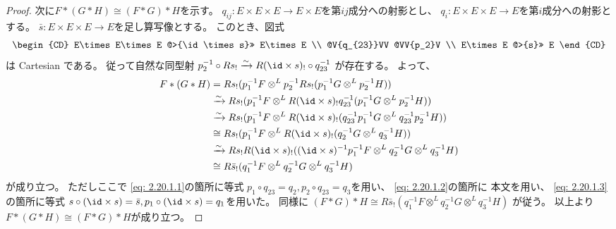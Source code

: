 \documentclass[uplatex,dvipdfmx]{jsarticle}
\begin{document}
\begin{proof}
  次に\(F*(G*H)\cong (F*G)*H\)を示す。
  \(q_{ij}:E\times E\times E \to E\times E\)を第\(ij\)成分への射影とし、
  \(q_i:E\times E\times E \to E\)を第\(i\)成分への射影とする。
  \(\bar{s}:E\times E\times E \to E\)を足し算写像とする。
  このとき、図式
  \[
  \begin{CD}
    E\times E\times E @>{\id\times s}>> E\times E \\
    @V{q_{23}}VV @VV{p_2}V \\
    E\times E @>{s}>> E
  \end{CD}
  \]
  は Cartesian である。
  従って自然な同型射
  \(p_2^{-1}\circ Rs_!\xrightarrow{\sim} R(\id\times s)_!\circ q_{23}^{-1}\)
  が存在する。
  よって、
  \begin{align}
    F*(G*H)
    &= Rs_!(p_1^{-1}F\otimes^L p_2^{-1}Rs_!(p_1^{-1}G\otimes^L p_2^{-1}H)) \notag \\
    &\xrightarrow{\sim}
    Rs_!(p_1^{-1}F\otimes^L R(\id\times s)_!q_{23}^{-1}(p_1^{-1}G\otimes^L p_2^{-1}H))
    \notag \\
    &\xrightarrow{\sim}
    Rs_!(p_1^{-1}F\otimes^L R(\id\times s)_!
    (q_{23}^{-1}p_1^{-1}G\otimes^L q_{23}^{-1}p_2^{-1}H)) \notag \\
    &\cong Rs_!(p_1^{-1}F\otimes^L R(\id\times s)_!(q_2^{-1}G\otimes^L q_3^{-1}H))
    \label{eq: 2.20.1.1} \\
    &\xrightarrow{\sim}
    Rs_!R(\id\times s)_!((\id\times s)^{-1} p_1^{-1}F
    \otimes^L q_2^{-1}G\otimes^L q_3^{-1}H)
    \label{eq: 2.20.1.2} \\
    &\cong R\bar{s}_!(q_1^{-1}F \otimes^L q_2^{-1}G\otimes^L q_3^{-1}H)
    \label{eq: 2.20.1.3}
  \end{align}
  が成り立つ。
  ただしここで
  \eqref{eq: 2.20.1.1}の箇所に等式
  \(p_1\circ q_{23} = q_2, p_2\circ q_{23} = q_3\)を用い、
  \eqref{eq: 2.20.1.2}の箇所に
  本文\cite[Proposition 2.6.6]{kashiwara2002sheaves}を用い、
  \eqref{eq: 2.20.1.3}の箇所に等式
  \(s\circ (\id\times s) = \bar{s}, p_1\circ (\id\times s) = q_1\)を用いた。
  同様に
  \((F*G)*H\cong R\bar{s}_!(q_1^{-1}F \otimes^L q_2^{-1}G\otimes^L q_3^{-1}H)\)
  が従う。
  以上より\(F*(G*H)\cong (F*G)*H\)が成り立つ。


\end{proof}
\end{document}
